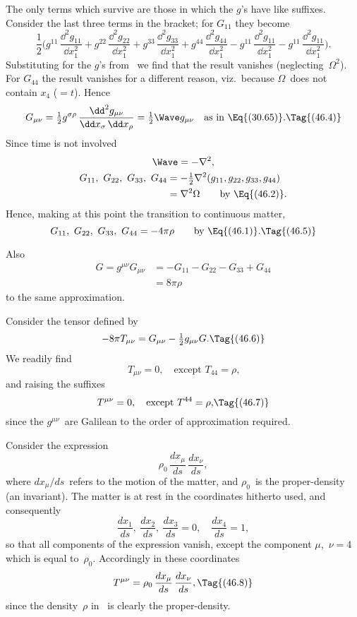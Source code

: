 \documentclass[12pt]{book}
\begin{document}
The only terms which survive are those in which the $g$'s have like suffixes.
Consider the last three terms in the bracket; for $G_{11}$ they become
\[
\frac{1}{2}\biggl(g^{11}\, \frac{\dd^{2} g_{11}}{\dd x_{1}^{2}}
+ g^{22}\, \frac{\dd^{2} g_{22}}{\dd x_{1}^{2}}
+ g^{33}\, \frac{\dd^{2} g_{33}}{\dd x_{1}^{2}}
+ g^{44}\, \frac{\dd^{2} g_{44}}{\dd x_{1}^{2}}
- g^{11}\, \frac{\dd^{2} g_{11}}{\dd x_{1}^{2}}
- g^{11}\, \frac{\dd^{2} g_{11}}{\dd x_{1}^{2}}\biggr).
\]
Substituting for the $g$'s from~ we find that the result vanishes (neglecting~$\Omega^2$).
For $G_{44}$ the result vanishes for a different reason, viz.\ because $\Omega$~does not
contain $x_{4}$ ($= t$). Hence
\[
G_{\mu\nu} = \tfrac{1}{2} g^{\sigma\rho}\, \frac{\dd^{2} g_{\mu\nu}}{\dd x_{\sigma}\, \dd x_{\rho}}
= \tfrac{1}{2} \Wave g_{\mu\nu}\quad\text{as in \Eq{(30.65)}.}
\Tag{(46.4)}
\]
Since time is not involved
\begin{gather*}
  \Wave = - \nabla^2, \\
  \begin{aligned}
    G_{11},\ G_{22},\ G_{33},\ G_{44}
    &= -\tfrac{1}{2} \nabla^2(g_{11}, g_{22}, g_{33}, g_{44}) \\
    &= \nabla^2\Omega \qquad\text{by \Eq{(46.2)}.}
  \end{aligned}
\end{gather*}
Hence, making at this point the transition to continuous matter,
\[
G_{11},\ G_{22},\ G_{33},\ G_{44} = -4\pi\rho
\qquad\text{by \Eq{(46.1)}.}
\Tag{(46.5)}
\]

Also
\begin{align*}
  G = g^{\mu\nu} G_{\mu\nu}
  &= -G_{11} - G_{22} - G_{33} + G_{44} \\
  &= 8\pi\rho
  \end{align*}
to the same approximation.

Consider the tensor defined by
%
\[
-8\pi T_{\mu\nu} = G_{\mu\nu} - \tfrac{1}{2} g_{\mu\nu} G.
\Tag{(46.6)}
\]
We readily find
\[
T_{\mu\nu}  = 0,\quad\text{except $T_{44} = \rho$,}
\]
and raising the suffixes
\[
T^{\mu\nu} = 0,\quad\text{except $T^{44} = \rho$,}
\Tag{(46.7)}
\]
since the $g^{\mu\nu}$~are Galilean to the order of approximation required.

Consider the expression
\[
\rho_{0}\, \frac{dx_{\mu}}{ds}\,\frac{dx_{\nu}}{ds},
\]
where $dx_{\mu}/ds$~refers to the motion of the matter, and $\rho_{0}$~is the proper\hyp{}density
(an invariant). The matter is at rest in the coordinates hitherto used, and
consequently
\[
\frac{dx_{1}}{ds},\
\frac{dx_{2}}{ds},\
\frac{dx_{3}}{ds} = 0,\quad
\frac{dx_{4}}{ds} = 1,
\]
so that all components of the expression vanish, except the component $\mu$,~$\nu = 4$
which is equal to~$\rho_{0}$. Accordingly in these coordinates
\[
T^{\mu\nu} = \rho_{0}\, \frac{dx_{\mu}}{ds}\,\frac{dx_{\nu}}{ds},
\Tag{(46.8)}
\]
since the density~$\rho$ in~ is clearly the proper\hyp{}density.
\end{document}
